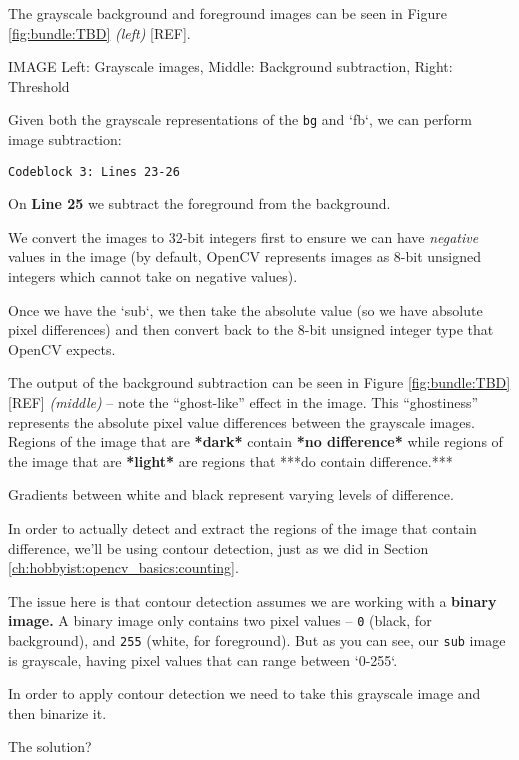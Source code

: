 The grayscale background and foreground images can be seen in Figure \ref{fig:bundle:TBD} \textit{(left)} [REF].

IMAGE Left: Grayscale images, Middle: Background subtraction, Right: Threshold

Given both the grayscale representations of the \texttt{bg} and `fb`, we can perform image subtraction:

\begin{verbatim}
Codeblock 3: Lines 23-26
\end{verbatim}

On \textbf{Line 25} we subtract the foreground from the background.

We convert the images to 32-bit integers first to ensure we can have \textit{negative} values in the image (by default, OpenCV represents images as 8-bit unsigned integers which cannot take on negative values).

Once we have the `sub`, we then take the absolute value (so we have absolute pixel differences) and then convert back to the 8-bit unsigned integer type that OpenCV expects.

The output of the background subtraction can be seen in Figure \ref{fig:bundle:TBD} [REF] \textit{(middle)} -- note the “ghost-like” effect in the image. This “ghostiness” represents the absolute pixel value differences between the grayscale images. Regions of the image that are \textbf{*dark*} contain \textbf{*no difference*} while regions of the image that are \textbf{*light*} are regions that ***do contain difference.***

Gradients between white and black represent varying levels of difference.

In order to actually detect and extract the regions of the image that contain difference, we’ll be using contour detection, just as we did in Section \ref{ch:hobbyist:opencv_basics:counting}.

The issue here is that contour detection assumes we are working with a \textbf{binary image.} A binary image only contains two pixel values -- \texttt{0} (black, for background), and \texttt{255} (white, for foreground). But as you can see, our \texttt{sub} image is grayscale, having pixel values that can range between `0-255`.

In order to apply contour detection we need to take this grayscale image and then binarize it.

The solution?

